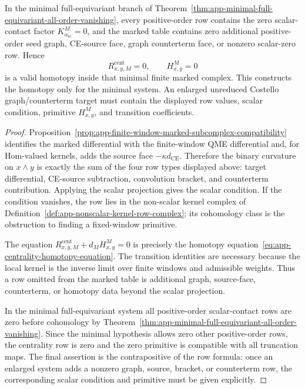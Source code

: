 \begin{prop}
  In the minimal full-equivariant branch of
  Theorem~\ref{thm:app-minimal-full-equivariant-all-order-vanishing},
  every positive-order row contains the zero scalar-contact factor
  \(K^M_{\alpha_{\mathrm{sc}}}=0\), and the marked table contains zero
  additional positive-order seed graph, CE-source face, graph counterterm
  face, or nonzero scalar-zero row.  Hence
  \[
    R^{\mathrm{cent}}_{x,y,M}=0,\qquad H^M_{x,y}=0
  \]
  is a valid homotopy inside that minimal finite marked complex.  This
  constructs the homotopy only for the minimal system.  An enlarged
  unreduced Costello graph/counterterm target must contain the displayed
  row values, scalar condition, primitive \(H^M_{x,y}\), and transition
  coefficients.
\end{prop}

\begin{proof}
  Proposition~\ref{prop:app-finite-window-marked-subcomplex-compatibility}
  identifies the marked differential with the finite-window QME
  differential and, for Hom-valued kernels, adds the source face
  \(-\kappa d_{\mathrm{CE}}\).  Therefore the binary curvature on
  \(x\wedge y\) is exactly the sum of the four row types displayed above:
  target differential, CE-source subtraction, convolution bracket, and
  counterterm contribution.  Applying the scalar projection gives the
  scalar condition.  If the condition vanishes, the row lies in the non-scalar
  kernel complex of
  Definition~\ref{def:app-nonscalar-kernel-row-complex}; its cohomology
  class is the obstruction to finding a fixed-window primitive.

  The equation
  \(R^{\mathrm{cent}}_{x,y,M}+d_M H^M_{x,y}=0\) is precisely the
  homotopy
  equation~\eqref{eq:app-centrality-homotopy-equation}.  The transition
  identities are necessary because the local kernel is the inverse limit
  over finite windows and admissible weights.  Thus a row omitted from
  the marked table is additional graph, source-face, counterterm, or
  homotopy data beyond the scalar projection.

  In the minimal full-equivariant system all positive-order scalar-contact
  rows are zero before cohomology by
  Theorem~\ref{thm:app-minimal-full-equivariant-all-order-vanishing}.
  Since the minimal hypothesis allows zero other positive-order rows, the
  centrality row is zero and the zero primitive is compatible with all
  truncation maps.  The final assertion is the contrapositive of the
  row formula: once an enlarged system adds a nonzero graph, source,
  bracket, or counterterm row, the corresponding scalar condition and primitive
  must be given explicitly.
\end{proof}

